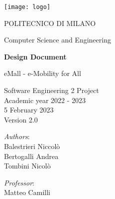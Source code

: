 \begin{titlingpage}
	\begin{center}
		\texttt{[image: logo]}
		
		\vspace{0.25cm}
		
		\LARGE POLITECNICO DI MILANO\\
		
		\vspace{0.2cm}
		
		\Large Computer Science and Engineering
		
		\vspace{0.8cm}
	
		\Huge \textbf{Design Document}
		
		\vspace{0.5cm}
		\huge eMall - e-Mobility for All
		
		\vspace{1.5cm}
		\LARGE Software Engineering 2 Project\\
		\Large Academic year 2022 - 2023\\
		\vspace{1cm}
		5 February 2023\\Version 2.0
		\vspace{2.5cm}
		
		\large
		\begin{minipage}{.1\textwidth}
			\null
		\end{minipage}%
		\begin{minipage}{.4\textwidth}
			\textit{Authors}:\\
			Balestrieri Niccolò\\
			Bertogalli Andrea\\
			Tombini Nicolò
		\end{minipage}%
		\begin{minipage}{.4\textwidth}
			\raggedleft	
			\textit{Professor}:\\
			Matteo Camilli\\
			\phantom{placeholder}
		\end{minipage}%
		\begin{minipage}{.1\textwidth}
			\null
		\end{minipage}
	
			
		\end{center}
\end{titlingpage}